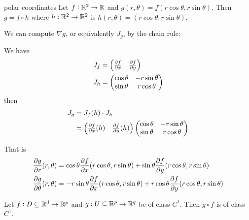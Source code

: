 \documentclass[14pt]{extarticle}
\begin{document}
\begin{example}{polar coordinates}
    Let $f: \mathbb{R}^2 \to \mathbb{R}$ and $g(r, \theta) = f(r \cos \theta, r \sin \theta)$.
    Then $g = f \circ h$ where $h: \mathbb{R}^2 \to \mathbb{R}^2$ is $h(r, \theta) = (r \cos \theta, r \sin \theta)$.

    We can compute $\nabla g$, or equivalently $J_g$, by the chain rule:

    We have
    \begin{align}
        J_f & = \begin{pmatrix}
                    \pdv{f}{x}() & \pdv{f}{y}()
                \end{pmatrix}  \\
        J_h & = \begin{pmatrix}
                    \cos \theta & -r \sin \theta \\
                    \sin \theta & r \cos \theta
                \end{pmatrix}
    \end{align}
    then
    \begin{align}
        J_g & = J_f(h) \cdot J_h                  \\
            & = \begin{pmatrix}
                    \pdv{f}{x}()(h) & \pdv{f}{y}()(h)
                \end{pmatrix}
        \begin{pmatrix}
            \cos \theta & -r \sin \theta \\
            \sin \theta & r \cos \theta
        \end{pmatrix}
    \end{align}

    That is
    \begin{align}
        \pdv{g}{r}()(r, \theta)      & = \cos \theta \pdv{f}{x}()(r \cos \theta, r \sin \theta) + \sin \theta \pdv{f}{y}()(r \cos \theta, r \sin \theta)      \\
        \pdv{g}{\theta}()(r, \theta) & = -r \sin \theta \pdv{f}{x}()(r \cos \theta, r \sin \theta) + r \cos \theta \pdv{f}{y}()(r \cos \theta, r \sin \theta)
    \end{align}

\end{example}

\begin{proposition}
    Let $f: D \subseteq \mathbb{R}^d \to \mathbb{R}^p$ and $g: U \subseteq \mathbb{R}^p \to \mathbb{R}^q$ be of class $C^1$.
    Then $g \circ f$ is of class $C^1$.
\end{proposition}
\end{document}
